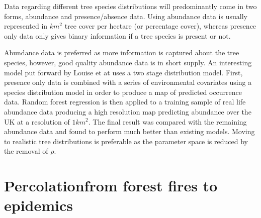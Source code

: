 
Data regarding different tree species distributions will predominantly come in two forms, abundance and presence/absence data. Using abundance data is usually represented in $km^2$ tree cover per hectare (or percentage cover), whereas presence only data only gives binary information if a tree species is present or not.

Abundance data is preferred as more information is captured about the tree species, however, good quality abundance data is in short supply. An interesting model put forward by Louise et at \cite{2STAGE} uses a two stage distribution model. First, presence only data is combined with a series of environmental covariates using a species distribution model in order to produce a map of predicted occurrence data. Random forest regression is then applied to a training sample of real life abundance data producing a high resolution map predicting abundance over the UK at a resolution of $1km^2$. The final result was compared with the remaining abundance data and found to perform much better than existing models. Moving to realistic tree distributions is preferable as the parameter space is reduced by the removal of $\rho$.


\section{Percolation\textemdash from forest fires to epidemics}
\label{section:lit-rev-perc}

